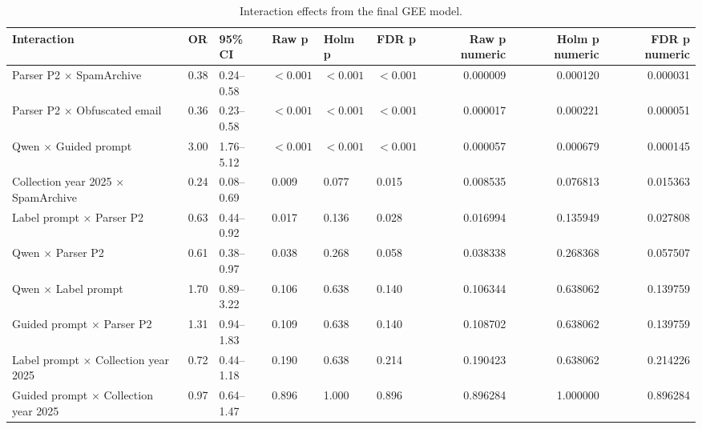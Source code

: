 \begin{table}[t]
\caption{Interaction effects from the final GEE model.}
\label{tab:gee_interactions}
\begin{tabular}{llllllrrr}
\toprule
Interaction & OR & 95\% CI & Raw p & Holm p & FDR p & Raw p numeric & Holm p numeric & FDR p numeric \\
\midrule
Parser P2 × SpamArchive & 0.38 & 0.24--0.58 & $<0.001$ & $<0.001$ & $<0.001$ & 0.000009 & 0.000120 & 0.000031 \\
Parser P2 × Obfuscated email & 0.36 & 0.23--0.58 & $<0.001$ & $<0.001$ & $<0.001$ & 0.000017 & 0.000221 & 0.000051 \\
Qwen × Guided prompt & 3.00 & 1.76--5.12 & $<0.001$ & $<0.001$ & $<0.001$ & 0.000057 & 0.000679 & 0.000145 \\
Collection year 2025 × SpamArchive & 0.24 & 0.08--0.69 & 0.009 & 0.077 & 0.015 & 0.008535 & 0.076813 & 0.015363 \\
Label prompt × Parser P2 & 0.63 & 0.44--0.92 & 0.017 & 0.136 & 0.028 & 0.016994 & 0.135949 & 0.027808 \\
Qwen × Parser P2 & 0.61 & 0.38--0.97 & 0.038 & 0.268 & 0.058 & 0.038338 & 0.268368 & 0.057507 \\
Qwen × Label prompt & 1.70 & 0.89--3.22 & 0.106 & 0.638 & 0.140 & 0.106344 & 0.638062 & 0.139759 \\
Guided prompt × Parser P2 & 1.31 & 0.94--1.83 & 0.109 & 0.638 & 0.140 & 0.108702 & 0.638062 & 0.139759 \\
Label prompt × Collection year 2025 & 0.72 & 0.44--1.18 & 0.190 & 0.638 & 0.214 & 0.190423 & 0.638062 & 0.214226 \\
Guided prompt × Collection year 2025 & 0.97 & 0.64--1.47 & 0.896 & 1.000 & 0.896 & 0.896284 & 1.000000 & 0.896284 \\
\bottomrule
\end{tabular}
\end{table}
